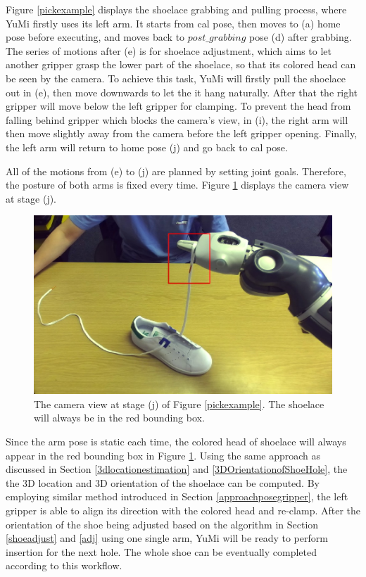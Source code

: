 Figure \ref{pickexample} displays the shoelace grabbing and pulling process, where YuMi firstly uses its left arm. It starts from cal pose, then moves to (a) home pose before executing, and moves back to $post\_grabbing$ pose (d) after grabbing. The series of motions after (e) is for shoelace adjustment, which aims to let another gripper grasp the lower part of the shoelace, so that its colored head can be seen by the camera. To achieve this task, YuMi will firstly pull the shoelace out in (e), then move downwards to let the it hang naturally. After that the right gripper will move below the left gripper for clamping. To prevent the head from falling behind gripper which blocks the camera's view, in (i), the right arm will then move slightly away from the camera before the left gripper opening. Finally, the left arm will return to home pose (j) and go back to cal pose. 

All of the motions from (e) to (j) are planned by setting joint goals. Therefore, the posture of both arms is fixed every time. Figure \ref{3dlace} displays the camera view at stage (j).

\begin{figure}[H]
\centering
\includegraphics[width = 0.6\columnwidth]{Implementation/mp/3dlace.jpg}
\caption{The camera view at stage (j) of Figure \ref{pickexample}. The shoelace will always be in the red bounding box.}
\label{3dlace}
\end{figure}

Since the arm pose is static each time, the colored head of shoelace will always appear in the red bounding box in Figure \ref{3dlace}. Using the same approach as discussed in Section \ref{3dlocationestimation} and \ref{3DOrientationofShoeHole}, the the 3D location and 3D orientation of the shoelace can be computed. By employing similar method introduced in Section \ref{approachposegripper}, the left gripper is able to align its direction with the colored head and re-clamp. After the orientation of the shoe being adjusted based on the algorithm in Section \ref{shoeadjust} and \ref{adj} using one single arm, YuMi will be ready to perform insertion for the next hole. The whole shoe can be eventually completed according to this workflow.